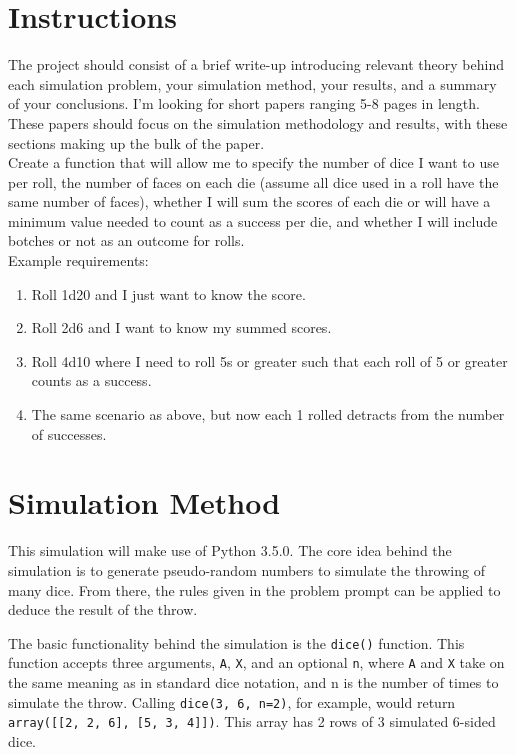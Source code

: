 \documentclass[twocolumn,letterpaper]{article}  %
\begin{document}
\section{Instructions}
The project should consist of a brief write-up introducing relevant theory behind each simulation problem, your simulation method, your results, and a summary of your conclusions. I'm looking for short papers ranging 5-8 pages in length. These papers should focus on the simulation methodology and results, with these sections making up the bulk of the paper.\\

Create a function that will allow me to specify the number of dice I want to use per roll, the number of faces on each die (assume all dice used in a roll have the same number of faces), whether I will sum the scores of each die or will have a minimum value needed to count as a success per die, and whether I will include botches or not as an outcome for rolls.\\

Example requirements:%
\begin{enumerate}
\itemsep-.25em
\item Roll 1d20 and I just want to know the score.
\item Roll 2d6 and I want to know my summed scores.
\item Roll 4d10 where I need to roll 5s or greater such that each roll of 5 or greater counts as a success.
\item The same scenario as above, but now each 1 rolled detracts from the number of successes.
\end{enumerate}

\section{Simulation Method}

This simulation will make use of Python 3.5.0. The core idea behind the simulation is to generate pseudo-random numbers to simulate the throwing of many dice. From there, the rules given in the problem prompt can be applied to deduce the result of the throw.

The basic functionality behind the simulation is the \texttt{dice()} function. This function accepts three arguments, \texttt{A}, \texttt{X}, and an optional \texttt{n}, where \texttt{A} and \texttt{X} take on the same meaning as in standard dice notation, and n is the number of times to simulate the throw. Calling \texttt{dice(3, 6, n=2)}, for example, would return \texttt{array([[2, 2, 6], [5, 3, 4]])}. This array has 2 rows of 3 simulated 6-sided dice.
\end{document}
